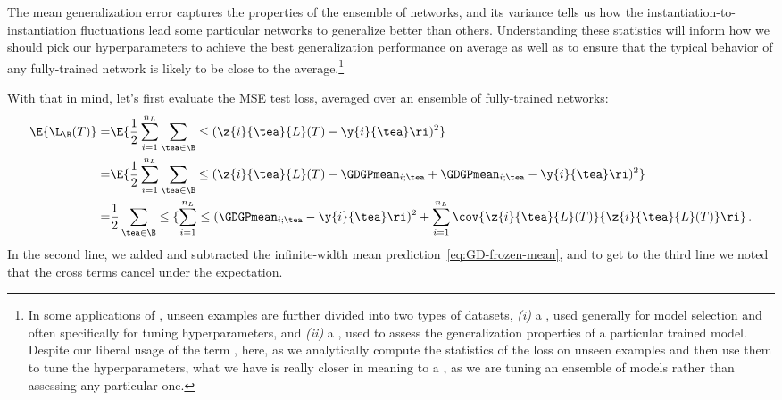The mean generalization error captures the  properties of the ensemble of networks, and its variance tells us how the instantiation-to-instantiation fluctuations lead some particular networks to generalize better than others.  Understanding these statistics will inform how we should pick our hyperparameters to achieve the best generalization performance on average as well as to ensure that the typical behavior of any fully-trained network is likely to be close to the average.\footnote{
In some applications of , unseen examples are further divided into two types of datasets, \emph{(i)} a , used generally for model selection and often specifically for tuning hyperparameters,
and \emph{(ii)} a , used to assess the generalization properties of a particular trained model. Despite our liberal usage of the term , here, as we analytically compute the statistics of the loss on unseen examples and then use them to tune the hyperparameters, what we have is really closer in meaning to a , as we are tuning an ensemble of models rather than assessing any particular one.
}







With that in mind, let's first evaluate the MSE test loss, averaged over an ensemble of fully-trained networks:
\begin{align}\label{eq:bias-variance-decomposition-generalized-mse}
\E{\L_{\B}(T)}=&\E{\frac{1}{2}\sum_{i=1}^{n_L}\sum_{\tea\in\B}\le(\z{i}{\tea}{L}(T)-\y{i}{\tea}\ri)^2}\, \notag\\
=&\E{\frac{1}{2}\sum_{i=1}^{n_L}\sum_{\tea\in\B}\le(\z{i}{\tea}{L}(T)-\GDGPmean_{i;\tea}+\GDGPmean_{i;\tea}-\y{i}{\tea}\ri)^2}\, \notag\\
=&\frac{1}{2}\sum_{\tea\in\B}\le\{\sum_{i=1}^{n_L}\le(\GDGPmean_{i;\tea}-\y{i}{\tea}\ri)^2+\sum_{i=1}^{n_L}\cov{\z{i}{\tea}{L}(T) }{ \z{i}{\tea}{L}(T) }\ri\}\, . 
\end{align}
In the second line, we added and subtracted the infinite-width mean prediction~\eqref{eq:GD-frozen-mean}, and to get to the third line we noted that the cross terms cancel under the expectation.


